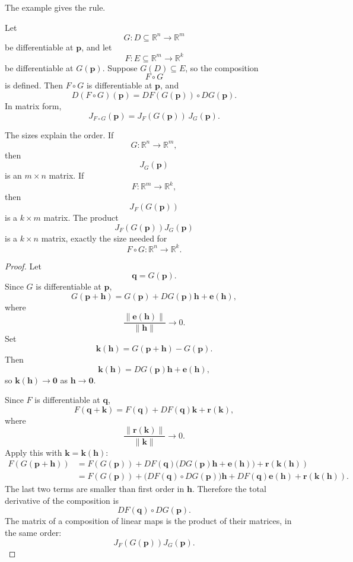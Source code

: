 The example gives the rule.

\begin{theorem}
Let
\[
    G:D\subseteq\mathbb R^n\to\mathbb R^m
\]
be differentiable at \(\mathbf p\), and let
\[
    F:E\subseteq\mathbb R^m\to\mathbb R^k
\]
be differentiable at \(G(\mathbf p)\).  Suppose \(G(D)\subseteq E\), so the
composition
\[
    F\circ G
\]
is defined.  Then \(F\circ G\) is differentiable at \(\mathbf p\), and
\[
\boxed{
    D(F\circ G)(\mathbf p)
    =
    DF(G(\mathbf p))\circ DG(\mathbf p).
}
\]
In matrix form,
\[
\boxed{
    J_{F\circ G}(\mathbf p)
    =
    J_F(G(\mathbf p))\,J_G(\mathbf p).
}
\]
\end{theorem}

The sizes explain the order.  If
\[
    G:\mathbb R^n\to\mathbb R^m,
\]
then
\[
    J_G(\mathbf p)
\]
is an \(m\times n\) matrix.  If
\[
    F:\mathbb R^m\to\mathbb R^k,
\]
then
\[
    J_F(G(\mathbf p))
\]
is a \(k\times m\) matrix.  The product
\[
    J_F(G(\mathbf p))J_G(\mathbf p)
\]
is a \(k\times n\) matrix, exactly the size needed for
\[
    F\circ G:\mathbb R^n\to\mathbb R^k.
\]

\begin{proof}
Let
\[
    \mathbf q=G(\mathbf p).
\]
Since \(G\) is differentiable at \(\mathbf p\),
\[
    G(\mathbf p+\mathbf h)
    =
    G(\mathbf p)+DG(\mathbf p)\mathbf h+\mathbf e(\mathbf h),
\]
where
\[
    \frac{\|\mathbf e(\mathbf h)\|}{\|\mathbf h\|}\to0.
\]
Set
\[
    \mathbf k(\mathbf h)
    =
    G(\mathbf p+\mathbf h)-G(\mathbf p).
\]
Then
\[
    \mathbf k(\mathbf h)=DG(\mathbf p)\mathbf h+\mathbf e(\mathbf h),
\]
so \(\mathbf k(\mathbf h)\to\mathbf 0\) as \(\mathbf h\to\mathbf 0\).

Since \(F\) is differentiable at \(\mathbf q\),
\[
    F(\mathbf q+\mathbf k)
    =
    F(\mathbf q)+DF(\mathbf q)\mathbf k+\mathbf r(\mathbf k),
\]
where
\[
    \frac{\|\mathbf r(\mathbf k)\|}{\|\mathbf k\|}\to0.
\]
Apply this with \(\mathbf k=\mathbf k(\mathbf h)\):
\[
\begin{aligned}
F(G(\mathbf p+\mathbf h))
&=
F(G(\mathbf p))
+
DF(\mathbf q)\bigl(DG(\mathbf p)\mathbf h+\mathbf e(\mathbf h)\bigr)
+
\mathbf r(\mathbf k(\mathbf h))\\
&=
F(G(\mathbf p))
+
\bigl(DF(\mathbf q)\circ DG(\mathbf p)\bigr)\mathbf h
+
DF(\mathbf q)\mathbf e(\mathbf h)
+
\mathbf r(\mathbf k(\mathbf h)).
\end{aligned}
\]
The last two terms are smaller than first order in \(\mathbf h\).  Therefore the total
derivative of the composition is
\[
    DF(\mathbf q)\circ DG(\mathbf p).
\]
The matrix of a composition of linear maps is the product of their matrices, in the same
order:
\[
    J_F(G(\mathbf p))J_G(\mathbf p).
\]
\end{proof}

